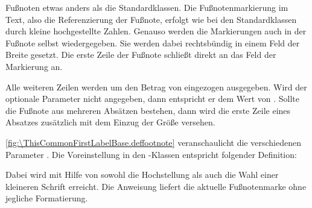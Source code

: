 \begin{Declaration}
\end{Declaration}%
Fußnoten etwas anders als die Standardklassen.
Die Fußnotenmarkierung im Text, also die Referenzierung der Fußnote, erfolgt
wie bei den Standardklassen durch kleine hochgestellte Zahlen.  Genauso werden
die Markierungen auch in der Fußnote selbst wiedergegeben. Sie werden dabei
rechtsbündig in einem Feld der Breite  gesetzt. Die erste
Zeile der Fußnote schließt direkt an das Feld der Markierung an.

Alle weiteren Zeilen werden um den Betrag von  eingezogen
ausgegeben. Wird der optionale Parameter  nicht angegeben,
dann entspricht er dem Wert von .  Sollte die Fußnote aus
mehreren Absätzen bestehen, dann wird die erste Zeile eines Absatzes
zusätzlich mit dem Einzug der Größe  versehen.

\autoref{fig:\ThisCommonFirstLabelBase.deffootnote} %
%
veranschaulicht die verschiedenen Parameter%
%
. Die Voreinstellung in den \KOMAScript-Klassen entspricht folgender
Definition: \IfThisCommonLabelBase{scrextend}{\iftrue}{\csname
  iffalse\endcsname}%
\begin{lstcode}
\end{lstcode}
\else
\begin{lstcode}
  \deffootnote[1em]{1.5em}{1em}{%
    \textsuperscript{\thefootnotemark}%
  }
\end{lstcode}
\fi%
Dabei wird mit Hilfe von 
sowohl die Hochstellung als auch die Wahl einer kleineren Schrift
erreicht. Die Anweisung  liefert die aktuelle
Fußnotenmarke ohne jegliche Formatierung.%
%

